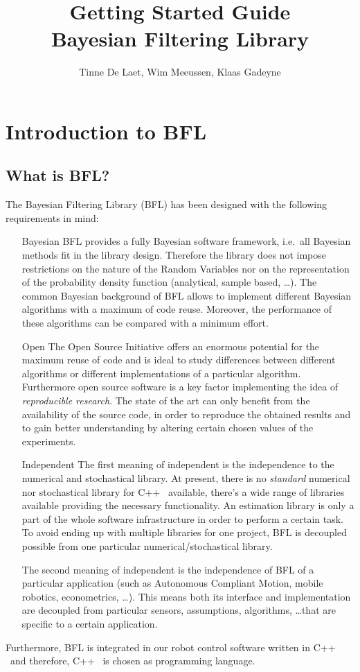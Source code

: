 \documentclass[a4paper,10pt]{report}
\title{Getting Started Guide \\  Bayesian Filtering Library}
\author{Tinne De Laet, Wim Meeussen, Klaas Gadeyne}
\begin{document}
\maketitle




\chapter{Introduction to BFL}
\section{What is BFL?}
The Bayesian Filtering Library (BFL) has been designed with the
following requirements in mind:
\begin{itemize}
\item [Bayesian] BFL provides a fully Bayesian software framework,
  i.e.~all Bayesian methods fit in the library design. Therefore the
  library does not impose restrictions on the nature of the Random
  Variables nor on the representation of the probability density
  function (analytical, sample based, \dots). The common Bayesian
  background of BFL allows to implement different Bayesian algorithms
  with a maximum of code reuse. Moreover, the performance of these
  algorithms can be compared with a minimum effort.
\item [Open] The Open Source Initiative offers an enormous potential
  for the maximum reuse of code and is ideal to study differences
  between different algorithms or different implementations of a
  particular algorithm. Furthermore open source software is a key
  factor implementing the idea of \emph{reproducible research}. The
  state of the art can only benefit from the availability of the
  source code, in order to reproduce the obtained results and to gain
  better understanding by altering certain chosen values of the
  experiments.
\item [Independent] The first meaning of independent is the
  independence to the numerical and stochastical library. At present,
  there is no \emph{standard} numerical nor stochastical library for
  C++ \ available, there's a wide range of libraries available
  providing the necessary functionality. An estimation library is only
  a part of the whole software infrastructure in order to perform a
  certain task. To avoid ending up with multiple libraries for one
  project, BFL is decoupled possible from one particular
  numerical/stochastical library.

  The second meaning of independent is the independence of BFL of a
  particular application (such as Autonomous Compliant Motion, mobile
  robotics, econometrics, \dots). This means both its interface and
  implementation are decoupled from particular sensors, assumptions,
  algorithms, \dots that are specific to a certain application.
\end{itemize}
Furthermore, BFL is integrated in our robot control software written
in C++ \ and therefore, C++ \ is chosen as programming language.
\end{document}
